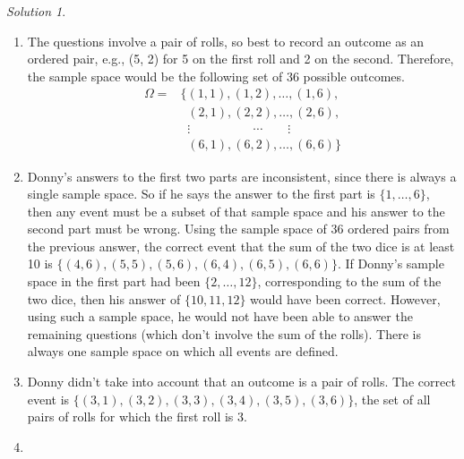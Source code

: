 \documentclass[
  letterpaper,
  DIV=11,
  numbers=noendperiod]{scrreprt}
\providecommand{\tightlist}{%
  \setlength{\itemsep}{0pt}\setlength{\parskip}{0pt}}
\theoremstyle{plain}
\theoremstyle{definition}
\theoremstyle{definition}
\theoremstyle{definition}
\theoremstyle{remark}
\newtheorem{refsolution}{Solution}[chapter]
\begin{document}
\begin{tcolorbox}[enhanced jigsaw, opacityback=0, rightrule=.15mm, coltitle=black, colframe=quarto-callout-tip-color-frame, toprule=.15mm, colbacktitle=quarto-callout-tip-color!10!white, opacitybacktitle=0.6, left=2mm, toptitle=1mm, breakable, title={Solution (click to expand)}, bottomtitle=1mm, colback=white, leftrule=.75mm, titlerule=0mm, arc=.35mm, bottomrule=.15mm]

\begin{refsolution}
\leavevmode

\begin{enumerate}
\def\labelenumi{\arabic{enumi}.}
\tightlist
\item
  The questions involve a pair of rolls, so best to record an outcome as
  an ordered pair, e.g., (5, 2) for 5 on the first roll and 2 on the
  second. Therefore, the sample space would be the following set of 36
  possible outcomes. \begin{align*}
  \Omega  = & \{
  (1, 1), (1, 2), \ldots, (1, 6),\\
  & \;\; (2, 1), (2, 2), \ldots, (2, 6),\\
  & \;\; \vdots\qquad \qquad \quad \cdots \qquad \vdots\\
  & \;\; (6, 1), (6, 2), \ldots, (6, 6)
  \}
  \end{align*}
\item
  Donny's answers to the first two parts are inconsistent, since there
  is always a single sample space. So if he says the answer to the first
  part is \(\{1, \ldots, 6\}\), then any event must be a subset of that
  sample space and his answer to the second part must be wrong. Using
  the sample space of 36 ordered pairs from the previous answer, the
  correct event that the sum of the two dice is at least 10 is
  \(\{(4, 6), (5, 5), (5, 6), (6, 4), (6, 5), (6, 6)\}\). If Donny's
  sample space in the first part had been \(\{2, \ldots, 12\}\),
  corresponding to the sum of the two dice, then his answer of
  \(\{10, 11, 12\}\) would have been correct. However, using such a
  sample space, he would not have been able to answer the remaining
  questions (which don't involve the sum of the rolls). There is always
  one sample space on which all events are defined.
\item
  Donny didn't take into account that an outcome is a pair of rolls. The
  correct event is
  \(\{(3, 1), (3, 2), (3, 3), (3, 4), (3, 5), (3, 6)\}\), the set of all
  pairs of rolls for which the first roll is 3.
\item

\end{enumerate}
\end{refsolution}
\end{tcolorbox}
\end{document}
